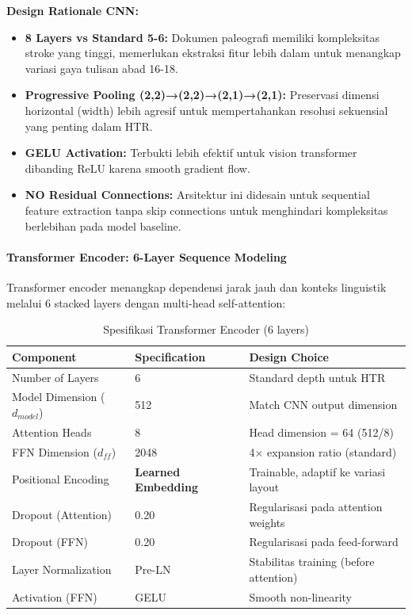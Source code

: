 \documentclass[12pt,a4paper]{article}
\begin{document}
\textbf{Design Rationale CNN:}
\begin{itemize}[nosep]
    \item \textbf{8 Layers vs Standard 5-6:} Dokumen paleografi memiliki kompleksitas stroke yang tinggi, memerlukan ekstraksi fitur lebih dalam untuk menangkap variasi gaya tulisan abad 16-18.
    \item \textbf{Progressive Pooling (2,2)→(2,2)→(2,1)→(2,1):} Preservasi dimensi horizontal (width) lebih agresif untuk mempertahankan resolusi sekuensial yang penting dalam HTR.
    \item \textbf{GELU Activation:} Terbukti lebih efektif untuk vision transformer dibanding ReLU karena smooth gradient flow.
    \item \textbf{NO Residual Connections:} Arsitektur ini didesain untuk sequential feature extraction tanpa skip connections untuk menghindari kompleksitas berlebihan pada model baseline.
\end{itemize}

\paragraph{Transformer Encoder: 6-Layer Sequence Modeling}

Transformer encoder menangkap dependensi jarak jauh dan konteks linguistik melalui 6 stacked layers dengan multi-head self-attention:

\begin{table}[H]
\centering
\caption{Spesifikasi Transformer Encoder (6 layers)}
\label{tab:recognizer-transformer-detailed}
\small
\begin{tabular}{|l|l|l|}
\hline
\textbf{Component} & \textbf{Specification} & \textbf{Design Choice} \\
\hline
Number of Layers & 6 & Standard depth untuk HTR \\
\hline
Model Dimension ($d_{model}$) & 512 & Match CNN output dimension \\
\hline
Attention Heads & 8 & Head dimension = 64 (512/8) \\
\hline
FFN Dimension ($d_{ff}$) & 2048 & 4× expansion ratio (standard) \\
\hline
Positional Encoding & \textbf{Learned Embedding} & Trainable, adaptif ke variasi layout \\
\hline
Dropout (Attention) & 0.20 & Regularisasi pada attention weights \\
\hline
Dropout (FFN) & 0.20 & Regularisasi pada feed-forward \\
\hline
Layer Normalization & Pre-LN & Stabilitas training (before attention) \\
\hline
Activation (FFN) & GELU & Smooth non-linearity \\
\hline
\end{tabular}
\end{table}
\end{document}
